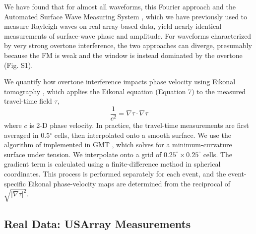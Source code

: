 \documentclass[extra,mreferee]{gji}
\begin{document}
We have found that for almost all waveforms, this Fourier approach and the Automated Surface Wave Measuring System \citep{jingmcc}, which we have previously used to measure Rayleigh waves on real array-based data, yield nearly identical measurements of surface-wave phase and amplitude. For waveforms characterized by very strong overtone interference, the two approaches can diverge, presumably because the FM is weak and the window is instead dominated by the overtone (Fig. S1).

We quantify how overtone interference impacts phase velocity using Eikonal tomography \citep{lin2009eikonal}, which applies the Eikonal equation (Equation 7) to the measured travel-time field $\tau$,  
\begin{equation}
\frac{1}{c^2} = \nabla \tau \cdot \nabla \tau
\end{equation}
\noindent
where $c$ is 2-D phase velocity. In practice, the travel-time measurements are first averaged in 0.5$^\circ$ cells, then interpolated onto a smooth surface. We use the algorithm of \citet{smith1990gridding} implemented in GMT \citep{wessel1998new}, which solves for a minimum-curvature surface under tension. We interpolate onto a grid of $0.25^\circ \times 0.25^\circ$ cells. The gradient term is calculated using a finite-difference method in spherical coordinates. This process is
performed separately for each event, and the event-specific Eikonal phase-velocity maps are determined from the reciprocal of $\sqrt{|\nabla \tau|^2}$. 

\subsection{Real Data: USArray Measurements}
\end{document}
